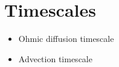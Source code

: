 \section{Timescales}
\begin{itemize}
\item Ohmic diffusion timescale
\item Advection timescale 
\end{itemize}